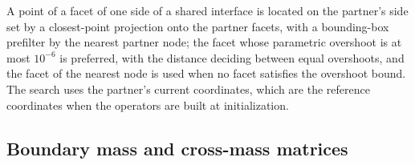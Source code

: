 \documentclass[11pt]{article}
\begin{document}
A point of a facet of one side of a shared interface is located on the
partner's side set by a closest-point projection onto the partner facets,
with a bounding-box prefilter by the nearest partner node; the facet whose
parametric overshoot is at most $10^{-6}$ is preferred, with the distance
deciding between equal overshoots, and the facet of the nearest node is
used when no facet satisfies the overshoot bound.
The search uses the partner's current coordinates, which are the reference
coordinates when the operators are built at initialization.

\subsection{Boundary mass and cross-mass matrices}
\label{sec:mass-matrices}
\end{document}

